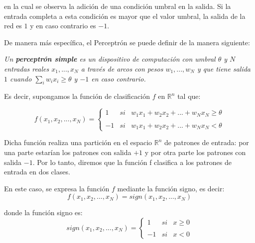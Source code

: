 \documentclass[a4paper, 11pt]{article} %
\begin{document}
en la cual se observa la adición de una condición umbral en la salida. Si la entrada completa a esta condición es mayor que el valor umbral, la salida de la red es $1$ y en caso contrario es $-1$.

De manera más específica, el Perceptrón se puede definir de la manera siguiente:

\textit{Un \textbf{perceptrón simple} es un dispositivo de computación con umbral $\theta$ y $N$ entradas reales $x_1, ..., x_N$ a través de arcos con pesos $w_1, ..., w_N$ y que tiene salida $1$ cuando $\sum_{i}w_ix_i \geq \theta$ y $-1$ en caso contrario.}

Es decir, supongamos la función  de clasificación $f$ en $\mathbb{R}^n$ tal que:

\[
f(x_1, x_2, ..., x_N) = \left\{ \begin{array}{lcc}
             1 &   si  & w_1x_1 + w_2x_2 + ... + w_Nx_N \geq \theta \\
             \\ -1 &  si  &  w_1x_1 + w_2x_2 + ... + w_Nx_N < \theta 
             \end{array}
   \right.
\]

Dicha función realiza una partición en el espacio $\mathbb{R}^n$ de patrones de entrada: por una parte estarían los patrones con salida $+1$ y por otra parte los patrones con salida $- 1$. Por lo tanto, diremos que la función f clasifica a los patrones de entrada en dos clases.

En este caso, se expresa la función $f$ mediante la función signo, es decir:
\[
f(x_1, x_2, ..., x_N) = sign(x_1, x_2, ..., x_N)
\]

donde la función signo es:
\[
sign(x_1, x_2, ..., x_N) = \left\{ \begin{array}{lcc}
             1 &   si  & x \geq 0 \\
             \\ -1 &  si  &  x < 0 
             \end{array}
   \right.
\]
\end{document}
